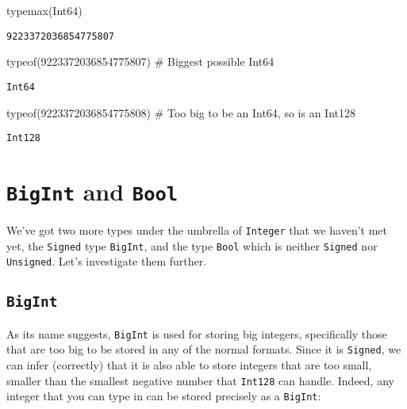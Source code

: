 \documentclass[
  letterpaper,
  DIV=11,
  numbers=noendperiod]{scrreprt}
\newenvironment{Shaded}{\begin{snugshade}}{\end{snugshade}}
\newcommand{\CommentTok}[1]{\textcolor[rgb]{0.37,0.37,0.37}{#1}}
\newcommand{\DataTypeTok}[1]{\textcolor[rgb]{0.68,0.00,0.00}{#1}}
\newcommand{\FloatTok}[1]{\textcolor[rgb]{0.68,0.00,0.00}{#1}}
\newcommand{\FunctionTok}[1]{\textcolor[rgb]{0.28,0.35,0.67}{#1}}
\newcommand{\NormalTok}[1]{\textcolor[rgb]{0.00,0.23,0.31}{#1}}
\begin{document}
\begin{Shaded}
\begin{Highlighting}[]
\FunctionTok{typemax}\NormalTok{(}\DataTypeTok{Int64}\NormalTok{)}
\end{Highlighting}
\end{Shaded}

\begin{verbatim}
9223372036854775807
\end{verbatim}

\begin{Shaded}
\begin{Highlighting}[]
\FunctionTok{typeof}\NormalTok{(}\FloatTok{9223372036854775807}\NormalTok{) }\CommentTok{\# Biggest possible Int64}
\end{Highlighting}
\end{Shaded}

\begin{verbatim}
Int64
\end{verbatim}

\begin{Shaded}
\begin{Highlighting}[]
\FunctionTok{typeof}\NormalTok{(}\FloatTok{9223372036854775808}\NormalTok{) }\CommentTok{\# Too big to be an Int64, so is an Int128}
\end{Highlighting}
\end{Shaded}

\begin{verbatim}
Int128
\end{verbatim}

\hypertarget{bigint-and-bool}{%
\section{\texorpdfstring{\texttt{BigInt} and
\texttt{Bool}}{BigInt and Bool}}\label{bigint-and-bool}}

We've got two more types under the umbrella of \texttt{Integer} that we
haven't met yet, the \texttt{Signed} type \texttt{BigInt}, and the type
\texttt{Bool} which is neither \texttt{Signed} nor \texttt{Unsigned}.
Let's investigate them further.

\hypertarget{bigint}{%
\subsection{\texorpdfstring{\texttt{BigInt}}{BigInt}}\label{bigint}}

As its name suggests, \texttt{BigInt} is used for storing big integers,
specifically those that are too big to be stored in any of the normal
formats. Since it is \texttt{Signed}, we can infer (correctly) that it
is also able to store integers that are too small, smaller than the
smallest negative number that \texttt{Int128} can handle. Indeed, any
integer that you can type in can be stored precisely as a
\texttt{BigInt}:
\end{document}
